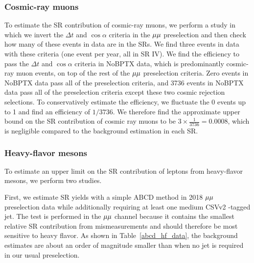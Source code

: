 

\subsubsection{Cosmic-ray muons}
To estimate the SR contribution of cosmic-ray muons, we perform a study in which we invert the $\Delta t$ and $\cos{\alpha}$ criteria in the ${\mu}{\mu}$ preselection and then check how many of these events in data are in the SRs. We find three events in data with these criteria (one event per year, all in SR IV). We find the efficiency to pass the $\Delta t$ and $\cos{\alpha}$ criteria in NoBPTX data, which is predominantly cosmic-ray muon events, on top of the rest of the ${\mu}{\mu}$ preselection criteria. Zero events in NoBPTX data pass all of the preselection criteria, and \num{3736} events in NoBPTX data pass all of the preselection criteria except these two cosmic rejection selections. To conservatively estimate the efficiency, we fluctuate the 0 events up to 1 and find an efficiency of $1/3736$. We therefore find the approximate upper bound on the SR contribution of cosmic ray muons to be $3\times\frac{1}{3736}=0.0008$, which is negligible compared to the background estimation in each SR.

\subsubsection{Heavy-flavor mesons}
To estimate an upper limit on the SR contribution of leptons from heavy-flavor mesons, we perform two studies.

First, we estimate SR yields with a simple ABCD method in 2018 ${\mu}{\mu}$ preselection data while additionally requiring at least one medium CSVv2 \PQb-tagged jet. The test is performed in the ${\mu}{\mu}$ channel because it contains the smallest relative SR contribution from mismeasurements and should therefore be most sensitive to heavy flavor. As shown in Table~\ref{abcd_hf_data}, the background estimates are about an order of magnitude smaller than when no \PQb jet is required in our usual preselection.



